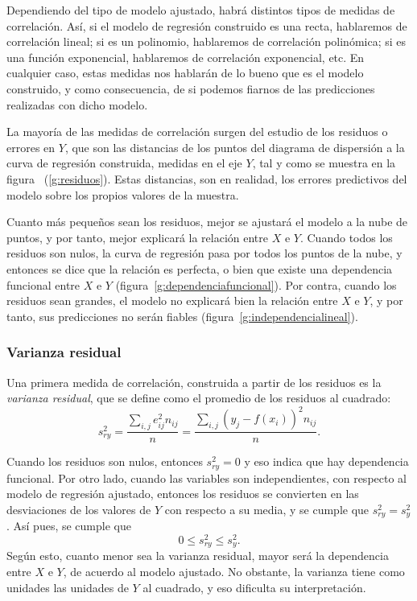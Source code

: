 Dependiendo del tipo de modelo ajustado, habrá distintos tipos de medidas de
correlación. Así, si el modelo de regresión construido es una recta,
hablaremos de correlación lineal; si es un polinomio, hablaremos de correlación
polinómica; si es una función exponencial, hablaremos de correlación
exponencial, etc. En cualquier caso, estas medidas nos hablarán de lo bueno
que es el modelo construido, y como consecuencia, de si podemos fiarnos de las
predicciones realizadas con dicho modelo.

La mayoría de las medidas de correlación surgen del estudio de los residuos o
errores en $Y$, que son las distancias de los puntos del diagrama de
dispersión a la curva de regresión construida, medidas en el eje $Y$, tal y
como se muestra en la figura ~(\ref{g:residuos}). Estas distancias, son en
realidad, los errores predictivos del modelo sobre los propios valores de la
muestra.

Cuanto más pequeños sean los residuos, mejor se ajustará el modelo a la nube
de puntos, y por tanto, mejor explicará la relación entre $X$ e $Y$. Cuando
todos los residuos son nulos, la curva de regresión pasa por todos los puntos
de la nube, y entonces se dice que la relación es perfecta, o bien que existe
una dependencia funcional entre $X$ e $Y$ (figura~\ref{g:dependenciafuncional}).
Por contra, cuando los residuos sean grandes, el modelo no explicará bien la
relación entre $X$ e $Y$, y por tanto, sus predicciones no serán fiables
(figura~\ref{g:independencialineal}).


\subsubsection{Varianza residual}
Una primera medida de correlación, construida a partir de los residuos es la
\emph{varianza residual}, que se define como el promedio de los residuos al
cuadrado:
\[
s^2_{ry}=\frac{\sum_{i,j} e_{ij}^2 n_{ij}}{n}= \frac{\sum_{i,j} (y_j-f(x_i))^2
n_{ij}}{n}.
\]

Cuando los residuos son nulos, entonces $s^2_{ry}=0$ y eso indica que hay
dependencia funcional. Por otro lado, cuando las variables son independientes,
con respecto al modelo de regresión ajustado, entonces los residuos se
convierten en las desviaciones de los valores de $Y$ con respecto a su media, y se cumple
que $s^2_{ry}=s_y^2$. Así pues, se cumple que
\[  0 \leq s^2_{ry}\leq s_y^2. \]
Según esto, cuanto menor sea la varianza residual, mayor será la dependencia
entre $X$ e $Y$, de acuerdo al modelo ajustado. No obstante, la varianza tiene
como unidades las unidades de $Y$ al cuadrado, y eso dificulta su
interpretación.

